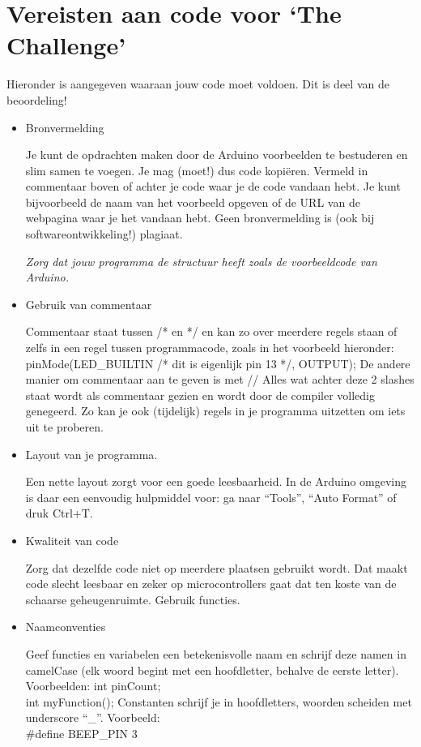 \chapter{Vereisten aan code voor ‘The Challenge’}

Hieronder is aangegeven waaraan jouw code moet voldoen. Dit is deel van de beoordeling!

\begin{itemize}
	\item Bronvermelding
	
Je kunt de opdrachten maken door de Arduino voorbeelden te bestuderen en slim samen te voegen. Je mag (moet!) dus code kopiëren. Vermeld in commentaar boven of achter je code waar je de code vandaan hebt. Je kunt bijvoorbeeld de naam van het voorbeeld opgeven of de URL van de webpagina waar je het vandaan hebt. Geen bronvermelding is (ook bij softwareontwikkeling!) plagiaat.

\textit{Zorg dat jouw programma de structuur heeft zoals de voorbeeldcode van Arduino. }

\item Gebruik van commentaar

Commentaar staat tussen /* en */ en kan zo over meerdere regels staan of zelfs in een regel tussen programmacode, zoals in het voorbeeld hieronder:\\
pinMode(LED\_BUILTIN /* dit is eigenlijk pin 13 */, OUTPUT);
De andere manier om commentaar aan te geven is met // 
Alles wat achter deze 2 slashes staat wordt als commentaar gezien en wordt door de compiler volledig genegeerd. Zo kan je ook (tijdelijk) regels in je programma uitzetten om iets uit te proberen.

\item Layout van je programma.

Een nette layout zorgt voor een goede leesbaarheid. In de Arduino omgeving is daar een eenvoudig hulpmiddel voor:  ga naar “Tools”, “Auto Format” of druk Ctrl+T.
\item Kwaliteit van code

Zorg dat dezelfde code niet op meerdere plaatsen gebruikt wordt. Dat maakt code slecht leesbaar en zeker op microcontrollers gaat dat ten koste van de schaarse geheugenruimte. Gebruik functies.

\item Naamconventies

Geef functies en variabelen een betekenisvolle naam en schrijf deze namen in camelCase (elk woord begint met een hoofdletter, behalve de eerste letter). Voorbeelden: 
int pinCount;\\
int myFunction();
Constanten schrijf je in hoofdletters, woorden scheiden met underscore “\_”. Voorbeeld: \\
\#define BEEP\_PIN 3 


\end{itemize}
